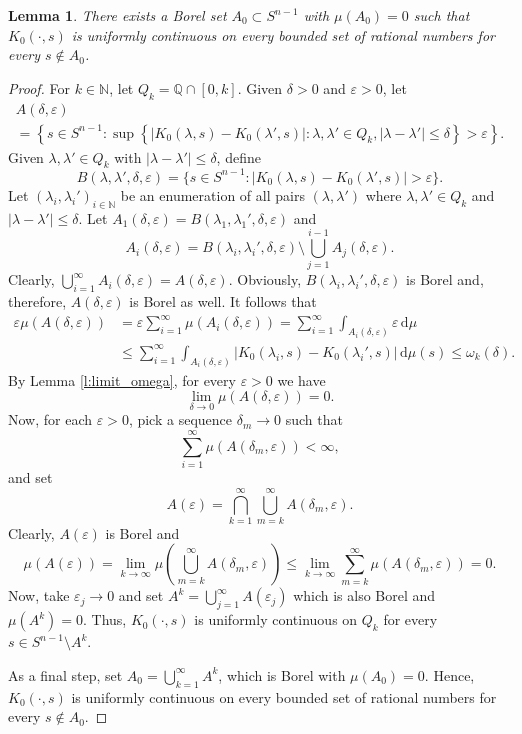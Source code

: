 \documentclass[11pt, a4paper]{amsart}
\newtheorem{lemma}[proposition]{Lemma}
\renewcommand{\d}{\,\mathrm{d}}
\newcommand{\sn}{{S^{n-1}}}
\renewcommand{\d}{\,\mathrm{d}}
\begin{document}
\begin{lemma}\label{l:appendix}
There exists a Borel set $A_0\subset\sn$ with $\mu(A_0)=0$ such that $K_0(\cdot,s)$ is uniformly continuous on every bounded set of rational numbers  for every $s\not\in A_0$.
\end{lemma}
\begin{proof}
For $k\in\mathbb{N}$, let $Q_k=\mathbb{Q}\cap [0,k]$. Given $\delta>0$ and $\varepsilon>0$, let
\begin{multline}
    A(\delta,\varepsilon)\\
    =\left\{s\in\sn\colon \sup\left\{|K_0(\lambda,s)-K_0(\lambda',s)|\colon \lambda,\lambda'\in Q_k,|\lambda-\lambda'|\leq\delta  \right\}>\varepsilon   \right\}.
\end{multline}
Given $\lambda,\lambda'\in Q_k$ with $|\lambda-\lambda'|\leq \delta$, define
\[
    B(\lambda,\lambda',\delta,\varepsilon)=\{s\in\sn:|K_0(\lambda,s)-K_0(\lambda',s)|>\varepsilon\}.
\]
Let $(\lambda_i,\lambda_i')_{i\in\mathbb{N}}$ be an enumeration of all pairs $(\lambda,\lambda')$ where $\lambda,\lambda'\in Q_k$ and $|\lambda-\lambda'|\leq\delta$. Let $A_1(\delta,\varepsilon)=B(\lambda_1,\lambda_1',\delta,\varepsilon)$ and
\[
    A_i(\delta,\varepsilon)=B(\lambda_i,\lambda_i',\delta,\varepsilon)\setminus\bigcup_{j=1}^{i-1}A_j(\delta,\varepsilon).
\]
Clearly, $\bigcup_{i=1}^\infty A_i(\delta,\varepsilon)=A(\delta,\varepsilon)$. Obviously, $B(\lambda_i,\lambda_i',\delta,\varepsilon)$ is Borel and, therefore, $A(\delta,\varepsilon)$ is Borel as well. It follows that
\begin{align*}
    \varepsilon\mu\left(A(\delta,\varepsilon)\right)&= \varepsilon\sum_{i=1}^\infty\mu(A_i(\delta,\varepsilon))=\sum_{i=1}^\infty \int_{A_i(\delta,\varepsilon)}\varepsilon\d \mu\\
    &\leq \sum_{i=1}^\infty \int_{A_i(\delta,\varepsilon)}|K_0(\lambda_i,s)-K_0(\lambda_i',s)|\d \mu(s)\leq \omega_k(\delta).
\end{align*}
By Lemma \ref{l:limit_omega}, for every $\varepsilon>0$ we have 
\[
    \lim_{\delta\to0}\mu\left(A(\delta,\varepsilon)\right)=0.
\]
Now, for each $\varepsilon>0$, pick a sequence $\delta_m\to 0$ such that
\[
    \sum_{i=1}^\infty \mu( A(\delta_m,\varepsilon))<\infty,
\]
and set
\[
    A(\varepsilon)=\bigcap_{k=1}^\infty\bigcup_{m=k}^\infty A(\delta_m,\varepsilon).
\]
Clearly, $A(\varepsilon)$ is Borel and
\[
    \mu(A(\varepsilon))=\lim_{k\to\infty}\mu\left(\bigcup_{m=k}^\infty A(\delta_m,\varepsilon)\right)\leq \lim_{k\to\infty}\sum_{m=k}^\infty\mu(A(\delta_m,\varepsilon))=0.
\]
Now, take $\varepsilon_j\to 0$ and set $A^k=\bigcup_{j=1}^\infty A(\varepsilon_j)$ which is also Borel and $\mu(A^k)=0$. Thus, $K_0(\cdot,s)$ is uniformly continuous on $Q_k$ for every $s\in \sn\setminus A^k$.

As a final step, set $A_0=\bigcup_{k=1}^\infty A^k$, which is Borel with $\mu(A_0)=0$. Hence,  $K_0(\cdot,s)$
is uniformly continuous on every bounded set of rational numbers for every $s\not\in A_0$.
\end{proof}
\end{document}
